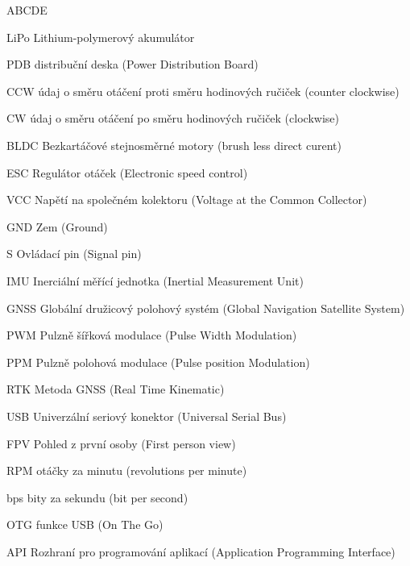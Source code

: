 
\begin{seznamzkratek}{ABCDE}      
	      
		  {LiPo}
	      {Lithium-polymerový akumulátor}
	      
	      {PDB}
	      {distribuční deska  (Power Distribution Board)}

	      {CCW}
	      {údaj o směru otáčení proti směru hodinových ručiček  (counter clockwise)}
	         
	      {CW}
	      {údaj o směru otáčení po směru hodinových ručiček (clockwise)}

	      {BLDC}
	      {Bezkartáčové stejnosměrné motory (brush less direct curent)}
	      
	      {ESC}
	      {Regulátor otáček (Electronic speed control)}	      
	    
	      {VCC}
	      {Napětí na společném kolektoru (Voltage at the Common Collector)} 
  
  		  {GND}
          {Zem (Ground)} 
          
          {S}
          {Ovládací pin (Signal pin)} 

		  {IMU}
          {Inerciální měřící jednotka (Inertial Measurement Unit)} 
          
          {GNSS}
          {Globální družicový polohový systém (Global Navigation Satellite System)} 
          
          {PWM}
          {Pulzně šířková modulace (Pulse Width Modulation)}
          
          {PPM}
          {Pulzně polohová modulace (Pulse position Modulation)}
          
          
          {RTK}
          {Metoda GNSS (Real Time Kinematic)}
          
          {USB}
          {Univerzální seriový konektor (Universal Serial Bus)}
          
          {FPV}
          {Pohled z první osoby (First person view)}
          
          {RPM}
          {otáčky za minutu (revolutions per minute)}
          
          {bps}
          {bity za sekundu (bit per second)}
          
          {OTG}
          {funkce USB (On The Go)}
          
          {API}
          {Rozhraní pro programování aplikací (Application Programming Interface)}

\end{seznamzkratek}
